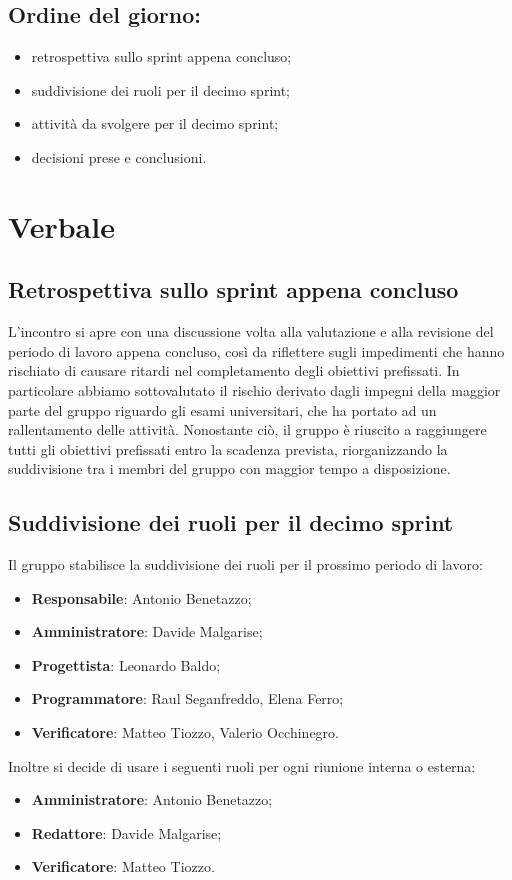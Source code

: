 \documentclass[italian,12pt]{article}
\begin{document}
\subsection*{Ordine del giorno:}
\begin{itemize}
	\item retrospettiva sullo sprint appena concluso;
	\item suddivisione dei ruoli per il decimo sprint;
	\item attività da svolgere per il decimo sprint;
	\item decisioni prese e conclusioni.
\end{itemize}


\newpage

\section{Verbale}

\subsection{Retrospettiva sullo sprint appena concluso}
L'incontro si apre con una discussione volta alla valutazione e alla revisione del periodo di lavoro appena concluso, così da riflettere sugli impedimenti che hanno rischiato di causare ritardi nel completamento degli obiettivi prefissati. In particolare abbiamo sottovalutato il rischio derivato dagli impegni della maggior parte del gruppo riguardo gli esami
universitari, che ha portato
ad un rallentamento delle attività. Nonostante ciò, il gruppo è riuscito a raggiungere tutti gli obiettivi prefissati entro la scadenza prevista,
riorganizzando la suddivisione tra i membri del gruppo con maggior tempo a disposizione.\\

\subsection{Suddivisione dei ruoli per il decimo sprint}
Il gruppo stabilisce la suddivisione dei ruoli per il prossimo periodo di lavoro:
\begin{itemize}
	\item \textbf{Responsabile}: Antonio Benetazzo;
	\item \textbf{Amministratore}: Davide Malgarise;
	\item \textbf{Progettista}: Leonardo Baldo;
	\item \textbf{Programmatore}: Raul Seganfreddo, Elena Ferro;
	\item \textbf{Verificatore}: Matteo Tiozzo, Valerio Occhinegro.
\end{itemize}
\newblock
Inoltre si decide di usare i seguenti ruoli per ogni riunione interna o esterna:
\begin{itemize}
	\item \textbf{Amministratore}: Antonio Benetazzo;
	\item \textbf{Redattore}: Davide Malgarise;
	\item \textbf{Verificatore}: Matteo Tiozzo.
\end{itemize}
\end{document}
